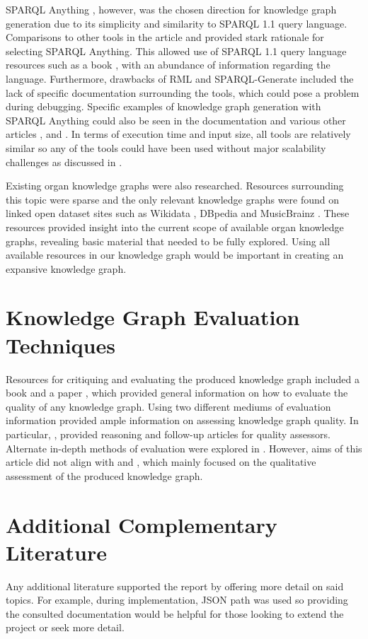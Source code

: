 SPARQL Anything \cite{sparqlanythinggithub}, however, was the chosen direction for knowledge graph generation due to its simplicity and similarity to SPARQL 1.1 query language. Comparisons to other tools in the article \cite{sparqlanything} and \cite{asprino2023knowledge} provided stark rationale for selecting SPARQL Anything. This allowed use of SPARQL 1.1 query language resources such as a book \cite{sparlbook}, with an abundance of information regarding the language. Furthermore, drawbacks of RML and SPARQL-Generate included the lack of specific documentation surrounding the tools, which could pose a problem during debugging. Specific examples of knowledge graph generation with SPARQL Anything could also be seen in the documentation \cite{sparqlanythinggithub} and various other articles \cite{sparqlanything}, \cite{asprino2023knowledge} and \cite{rattaknowledge}. In terms of execution time and input size, all tools are relatively similar so any of the tools could have been used without major scalability challenges as discussed in \cite{sparqlanything}. 

Existing organ knowledge graphs were also researched. Resources surrounding this topic were sparse and the only relevant knowledge graphs were found on linked open dataset sites such as Wikidata \cite{organwikidata}, DBpedia \cite{organdbpedia} and MusicBrainz \cite{organmusicbrainz}. These resources provided insight into the current scope of available organ knowledge graphs, revealing basic material that needed to be fully explored. Using all available resources in our knowledge graph would be important in creating an expansive knowledge graph.

\section{Knowledge Graph Evaluation Techniques}
\hspace{0.5cm} Resources for critiquing and evaluating the produced knowledge graph included a book \cite{knowledgegraphevaulationbook} and a paper \cite{evaluationpaper}, which provided general information on how to evaluate the quality of any knowledge graph. Using two different mediums of evaluation information provided ample information on assessing knowledge graph quality. In particular, \cite{evaluationpaper}, provided reasoning and follow-up articles for quality assessors. Alternate in-depth methods of evaluation were explored in \cite{gao2019efficient}. However, aims of this article did not align with \cite{knowledgegraphevaulationbook} and \cite{evaluationpaper}, which mainly focused on the qualitative assessment of the produced knowledge graph. 

\section{Additional Complementary Literature}
\hspace{0.5cm} Any additional literature supported the report by offering more detail on said topics. For example, during implementation, JSON path was used so providing the consulted documentation \cite{jsonpath} would be helpful for those looking to extend the project or seek more detail. 

